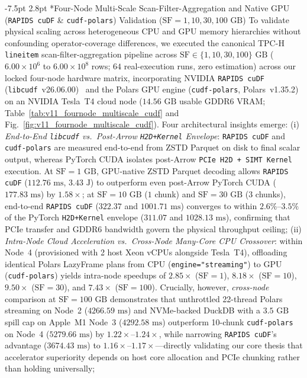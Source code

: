 \documentclass[10pt,a4paper]{article}
\makeatletter
\renewcommand\subsection{\@startsection{subsection}{2}{\z@}%
  {-7.5pt \@plus -2pt \@minus -1pt}%
  {2.8pt \@plus 1pt}%
  {\normalfont\normalsize\bfseries}}
\makeatother
\begin{document}
\subsection*{Four-Node Multi-Scale Scan-Filter-Aggregation and Native GPU (\texttt{RAPIDS cuDF} \& \texttt{cudf-polars}) Validation ($\text{SF}=1, 10, 30, 100\text{ GB}$)}
To validate physical scaling across heterogeneous CPU and GPU memory hierarchies without confounding operator-coverage differences, we executed the canonical TPC-H \texttt{lineitem} scan-filter-aggregation pipeline across $\text{SF} \in \{1, 10, 30, 100\}\text{ GB}$ ($6.00 \times 10^{6}$ to $6.00 \times 10^{8}$ rows; $64$ real-execution runs, zero estimation) across our locked four-node hardware matrix, incorporating NVIDIA \texttt{RAPIDS cuDF} (\texttt{libcudf}~v26.06.00)~\cite{rapids2024cudf} and the Polars GPU engine (\texttt{cudf-polars}, Polars~v1.35.2) on an NVIDIA Tesla~T4 cloud node ($14.56\text{ GB}$ usable GDDR6 VRAM; Table~\ref{tab:v11_fournode_multiscale_cudf} and Fig.~\ref{fig:v11_fournode_multiscale_cudf}). Four architectural insights emerge:
(i) \emph{End-to-End \texttt{libcudf} vs.\ Post-Arrow \texttt{H2D+Kernel} Envelope}: \texttt{RAPIDS cuDF} and \texttt{cudf-polars} are measured end-to-end from ZSTD Parquet on disk to final scalar output, whereas PyTorch CUDA isolates post-Arrow \texttt{PCIe H2D + SIMT Kernel} execution. At $\text{SF}=1\text{ GB}$, GPU-native ZSTD Parquet decoding allows \texttt{RAPIDS cuDF} ($112.76\text{ ms}$, $3.43\text{ J}$) to outperform even post-Arrow PyTorch CUDA ($177.83\text{ ms}$) by $1.58\times$; at $\text{SF}=10\text{ GB}$ ($1$ chunk) and $\text{SF}=30\text{ GB}$ ($3$ chunks), end-to-end \texttt{RAPIDS cuDF} ($322.37$ and $1001.71\text{ ms}$) converges to within $2.6\%\text{--}3.5\%$ of the PyTorch \texttt{H2D+Kernel} envelope ($311.07$ and $1028.13\text{ ms}$), confirming that PCIe transfer and GDDR6 bandwidth govern the physical throughput ceiling;
(ii) \emph{Intra-Node Cloud Acceleration vs.\ Cross-Node Many-Core CPU Crossover}: within Node~4 (provisioned with 2 host Xeon vCPUs alongside Tesla~T4), offloading identical Polars LazyFrame plans from CPU (\texttt{engine="streaming"}) to GPU (\texttt{cudf-polars}) yields intra-node speedups of $2.85\times$ ($\text{SF}=1$), $8.18\times$ ($\text{SF}=10$), $9.50\times$ ($\text{SF}=30$), and $7.43\times$ ($\text{SF}=100$). Crucially, however, \emph{cross-node} comparison at $\text{SF}=100\text{ GB}$ demonstrates that unthrottled 22-thread Polars streaming on Node~2 ($4266.59\text{ ms}$) and NVMe-backed DuckDB with a $3.5\text{ GB}$ spill cap on Apple~M1 Node~3 ($4292.58\text{ ms}$) outperform 10-chunk \texttt{cudf-polars} on Node~4 ($5279.66\text{ ms}$) by $1.22\times\text{--}1.24\times$, while narrowing \texttt{RAPIDS cuDF}'s advantage ($3674.43\text{ ms}$) to $1.16\times\text{--}1.17\times$---directly validating our core thesis that accelerator superiority depends on host core allocation and PCIe chunking rather than holding universally;
\end{document}
